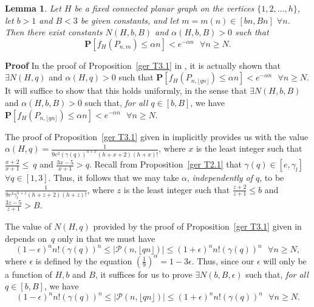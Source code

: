 \documentclass{article}
\newtheorem{Lemma}[Theorem]{Lemma}
\newtheorem{Proof of Theorem}{Proof of Theorem}
\begin{document}
\begin{Lemma} \label{gen2}
Let $H$ be a fixed connected planar graph on the vertices $\{1,2, \ldots ,h\}$,
let $b>1$ and $B<3$ be given constants,
and let $m=m(n) \in [bn,Bn]$ $\forall n$.
Then there exist constants $N(H,b,B)$ and $\alpha(H,b,B) >0$ such that
\begin{displaymath}
\mathbf{P}[f_{H}(P_{n,m}) \leq \alpha n] < e^{- \alpha n} \textrm{ } \forall n \geq N.
\end{displaymath}
\end{Lemma}
\textbf{Proof}
In the proof of Proposition~\ref{ger T3.1} in \cite{ger},
it is actually shown that $\exists N(H,q)$ and $\alpha (H,q) >0$ such that 
$\mathbf{P}[f_{H}(P_{n, \lfloor qn \rfloor}) \leq \alpha n] < e^{- \alpha n} \textrm{ } \forall n \geq N.$
It will suffice to show that this holds uniformly,
in the sense that $\exists N(H,b,B)$ and $\alpha(H,b,B)>0$
such that, \textit{for all $q \in [b,B]$},
we have
$\mathbf{P}[f_{H}(P_{n, \lfloor qn \rfloor}) \leq \alpha n] < e^{- \alpha n} \textrm{ } \forall n \geq N$.

The proof of Proposition~\ref{ger T3.1} given in \cite{ger} implicitly provides us with the value 
$\alpha (H,q) = \frac{1}{9e^{2}(\gamma (q))^{h+x}(h+x+2)(h+x)!}$,
where $x$ is the least integer such that 
$\frac{x+2}{x+1} \leq~q$ and $\frac{3x-5}{x+1} > q$.
Recall from Proposition~\ref{ger T2.1} 
that $\gamma (q) \in [e, \gamma_{l}]$~$\forall q \in [1,3]$.
Thus, it follows that we may take $\alpha$, \textit{independently of $q$}, 
to be $\frac{1}{9e^{2}\gamma_{l}^{h+z}(h+z+2)(h+z)!}$, 
where $z$ is the least integer such that $\frac{z+2}{z+1} \leq b$ and $\frac{3z-5}{z+1} > B$.

The value of $N(H,q)$ provided by the proof of Proposition~\ref{ger T3.1} given in \cite{ger} depends on~$q$ 
only in that we must have 
\begin{displaymath}
(1-\epsilon)^{n}n!(\gamma (q))^{n} \leq |\mathcal{P}(n, \lfloor qn \rfloor)| \leq 
(1+\epsilon)^{n}n!(\gamma (q))^{n} \textrm{ }\forall n \geq N,
\end{displaymath}
where $\epsilon$ is defined by the equation $\left( \frac{1}{9} \right)^{\alpha} = 1-3\epsilon$.
Thus, since our $\epsilon$ will only be a function of $H,b$ and $B$,
it suffices for us to prove $\exists N(b,B,\epsilon)$ such that, \emph{for all} $q \in [b,B]$, we have 
\begin{displaymath}
(1-\epsilon)^{n}n!(\gamma (q))^{n} \leq |\mathcal{P}(n, \lfloor qn \rfloor)| \leq 
(1+ \epsilon)^{n}n!(\gamma (q))^{n} \textrm{ }\forall n \geq N.
\end{displaymath}
\end{document}
